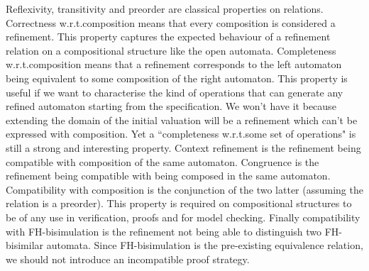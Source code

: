 \documentclass{article}
\begin{document}
Reflexivity, transitivity and preorder are classical properties on relations.
Correctness w.r.t.\@ composition means that every composition is considered a refinement. 
This property captures the expected behaviour of a refinement relation on a compositional structure like the open automata.
Completeness w.r.t.\@ composition means that a refinement corresponds to the left automaton being equivalent to some composition of the right automaton.
This property is useful if we want to characterise the kind of operations that can generate any refined automaton starting from the specification.
We won't have it because extending the domain of the initial valuation will be a refinement which can't be expressed with composition.
Yet a ``completeness w.r.t.\@ some set of operations" is still a strong and interesting property.
Context refinement is the refinement being compatible with composition of the same automaton.
Congruence is the refinement being compatible with being composed in the same automaton.
Compatibility with composition is the conjunction of the two latter (assuming the relation is a preorder).
This property is required on compositional structures to be of any use in verification, proofs and for model checking.
Finally compatibility with FH-bisimulation is the refinement not being able to distinguish two FH-bisimilar automata.
Since FH-bisimulation is the pre-existing equivalence relation, we should not introduce an incompatible proof strategy.
\end{document}
